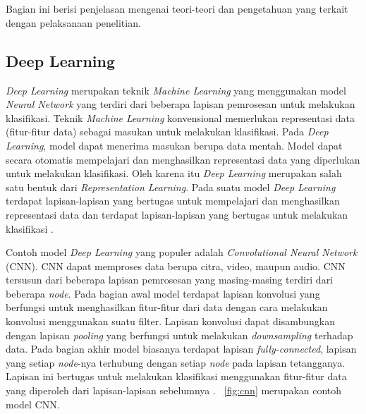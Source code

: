 \chapter{\babDua}
Bagian ini berisi penjelasan mengenai teori-teori dan pengetahuan yang terkait dengan pelaksanaan penelitian.

\section{Deep Learning}
\textit{Deep Learning} merupakan teknik \textit{Machine Learning} yang menggunakan model \textit{Neural Network} yang terdiri dari beberapa lapisan pemrosesan untuk melakukan klasifikasi. Teknik \textit{Machine Learning} konvensional memerlukan representasi data (fitur-fitur data) sebagai masukan untuk melakukan klasifikasi. Pada \textit{Deep Learning}, model dapat menerima masukan berupa data mentah. Model dapat secara otomatis mempelajari dan menghasilkan representasi data yang diperlukan untuk melakukan klasifikasi. Oleh karena itu \textit{Deep Learning} merupakan salah satu bentuk dari \textit{Representation Learning}. Pada suatu model \textit{Deep Learning} terdapat lapisan-lapisan yang bertugas untuk mempelajari dan menghasilkan representasi data dan terdapat lapisan-lapisan yang bertugas untuk melakukan klasifikasi \cite{deeplearning}. 

Contoh model \textit{Deep Learning} yang populer adalah \textit{Convolutional Neural Network} (CNN). CNN dapat memproses data berupa citra, video, maupun audio. CNN tersusun dari beberapa lapisan pemrosesan yang masing-masing terdiri dari beberapa \textit{node}. Pada bagian awal model terdapat lapisan konvolusi yang berfungsi untuk menghasilkan fitur-fitur dari data dengan cara melakukan konvolusi menggunakan suatu filter. Lapisan konvolusi dapat disambungkan dengan lapisan \textit{pooling} yang berfungsi untuk melakukan \textit{downsampling} terhadap data. Pada bagian akhir model biasanya terdapat lapisan \textit{fully-connected}, lapisan yang setiap \textit{node}-nya terhubung dengan setiap \textit{node} pada lapisan tetangganya. Lapisan ini bertugas untuk melakukan klasifikasi menggunakan fitur-fitur data yang diperoleh dari lapisan-lapisan sebelumnya \cite{deeplearning}. \pic~\ref{fig:cnn} merupakan contoh model CNN.

